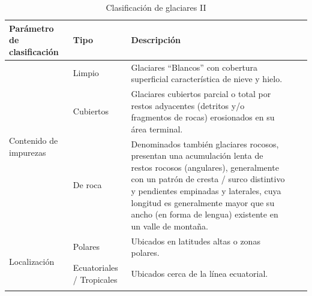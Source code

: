 \begin{table}[H]
    \caption{Clasificación de glaciares II}
    \small
    \begin{tabularx}{\linewidth}{@{} *5{X} @{}}
        \hline
        \textbf{Parámetro de clasificación}                   & \textbf{Tipo}             & \textbf{Descripción}                                                                                                                                                                                                                                                                                      \\ \hline
        \multirow{3}{=}{\parbox{4cm}{Contenido de impurezas}} & Limpio                    & Glaciares “Blancos” con cobertura superficial característica de nieve y hielo.                                                                                                                                                                                                                            \\ \cline{2-3}
                                                              & Cubiertos                 & Glaciares cubiertos parcial o total por restos adyacentes (detritos y/o fragmentos de rocas) erosionados en su área terminal.                                                                                                                                                                             \\ \cline{2-3}
                                                              & De roca                   & Denominados también glaciares rocosos, presentan una acumulación lenta de restos rocosos (angulares), generalmente con un patrón de cresta / surco distintivo y pendientes empinadas y laterales, cuya longitud es generalmente mayor que su ancho (en forma de lengua) existente en un valle de montaña. \\ \hline
        \multirow{4}{=}{\parbox{4cm}{Localización}}           & Polares                   & Ubicados en latitudes altas o zonas polares.                                                                                                                                                                                                                                                              \\ \cline{2-3}
                                                              & Ecuatoriales / Tropicales & Ubicados cerca de la línea ecuatorial.                                                                                                                                                                                                                                                                    \\ \cline{2-3}

\end{tabularx}
\end{table}
